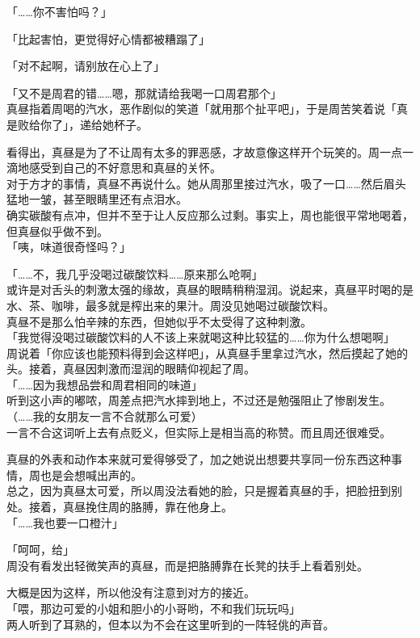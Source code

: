 「……你不害怕吗？」

「比起害怕，更觉得好心情都被糟蹋了」

「对不起啊，请别放在心上了」

「又不是周君的错……嗯，那就请给我喝一口周君那个」\\

真昼指着周喝的汽水，恶作剧似的笑道「就用那个扯平吧」，于是周苦笑着说「真是败给你了」，递给她杯子。

看得出，真昼是为了不让周有太多的罪恶感，才故意像这样开个玩笑的。周一点一滴地感受到自己的不好意思和真昼的关怀。\\

对于方才的事情，真昼不再说什么。她从周那里接过汽水，吸了一口……然后眉头猛地一皱，甚至眼睛里还有点泪水。\\

确实碳酸有点冲，但并不至于让人反应那么过剩。事实上，周也能很平常地喝着，但真昼似乎做不到。\\

「咦，味道很奇怪吗？」

「……不，我几乎没喝过碳酸饮料……原来那么呛啊」\\

或许是对舌头的刺激太强的缘故，真昼的眼睛稍稍湿润。说起来，真昼平时喝的是水、茶、咖啡，最多就是榨出来的果汁。周没见她喝过碳酸饮料。\\

真昼不是那么怕辛辣的东西，但她似乎不太受得了这种刺激。\\

「我觉得没喝过碳酸饮料的人不该上来就喝这种比较猛的……你为什么想喝啊」\\

周说着「你应该也能预料得到会这样吧」，从真昼手里拿过汽水，然后摸起了她的头。接着，真昼因刺激而湿润的眼睛仰视起了周。\\

「……因为我想品尝和周君相同的味道」\\

听到这小声的嘟哝，周差点把汽水摔到地上，不过还是勉强阻止了惨剧发生。\\

（……我的女朋友一言不合就那么可爱）\\

一言不合这词听上去有点贬义，但实际上是相当高的称赞。而且周还很难受。

真昼的外表和动作本来就可爱得够受了，加之她说出想要共享同一份东西这种事情，周也是会想喊出声的。\\

总之，因为真昼太可爱，所以周没法看她的脸，只是握着真昼的手，把脸扭到别处。接着，真昼挽住周的胳膊，靠在他身上。\\

「……我也要一口橙汁」

「呵呵，给」\\

周没有看发出轻微笑声的真昼，而是把胳膊靠在长凳的扶手上看着别处。

大概是因为这样，所以他没有注意到对方的接近。\\

「喂，那边可爱的小姐和胆小的小哥哟，不和我们玩玩吗」\\

两人听到了耳熟的，但本以为不会在这里听到的一阵轻佻的声音。
